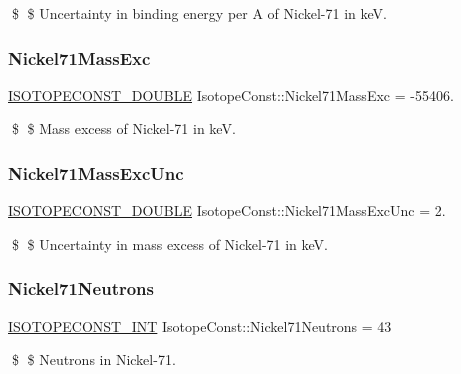 \$ \$ Uncertainty in binding energy per A of Nickel-\/71 in keV. \mbox{\label{group___isotope_const-_nickel-_ni71_ga0636ecf77187c522bb29a0b1cf75bab0}} 
\subsubsection{\texorpdfstring{Nickel71\+Mass\+Exc}{Nickel71MassExc}}
{\footnotesize\ttfamily \mbox{\hyperlink{group___isotope_const-_macros_ga8f45a7272ce02c0b4c65c44636ed719a}{I\+S\+O\+T\+O\+P\+E\+C\+O\+N\+S\+T\+\_\+\+D\+O\+U\+B\+LE}} Isotope\+Const\+::\+Nickel71\+Mass\+Exc = -\/55406.}

\$ \$ Mass excess of Nickel-\/71 in keV. \mbox{\label{group___isotope_const-_nickel-_ni71_ga3decfefa79e81d8e188c839f24957175}} 
\subsubsection{\texorpdfstring{Nickel71\+Mass\+Exc\+Unc}{Nickel71MassExcUnc}}
{\footnotesize\ttfamily \mbox{\hyperlink{group___isotope_const-_macros_ga8f45a7272ce02c0b4c65c44636ed719a}{I\+S\+O\+T\+O\+P\+E\+C\+O\+N\+S\+T\+\_\+\+D\+O\+U\+B\+LE}} Isotope\+Const\+::\+Nickel71\+Mass\+Exc\+Unc = 2.}

\$ \$ Uncertainty in mass excess of Nickel-\/71 in keV. \mbox{\label{group___isotope_const-_nickel-_ni71_ga20408c7c2788a91c5554bd70ac92e8f0}} 
\subsubsection{\texorpdfstring{Nickel71\+Neutrons}{Nickel71Neutrons}}
{\footnotesize\ttfamily \mbox{\hyperlink{group___isotope_const-_macros_ga5f18360b3e99483a35c32d789e62621c}{I\+S\+O\+T\+O\+P\+E\+C\+O\+N\+S\+T\+\_\+\+I\+NT}} Isotope\+Const\+::\+Nickel71\+Neutrons = 43}

\$ \$ Neutrons in Nickel-\/71. \mbox{\label{group___isotope_const-_nickel-_ni71_ga6181664e458b7f025affe01405ff4ac9}} 
